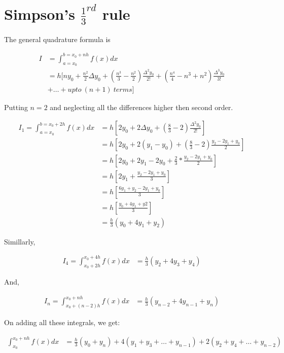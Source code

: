\documentclass{article}
\begin{document}
  \section{Simpson's $\frac{1}{3}^{rd}$ rule}
    The general quadrature formula is 

    \begin{align*}
      I &=\int_{a=x_0}^{b=x_0+nh}f(x)dx\\
        &= h[ny_0+\frac{n^2}{2}\Delta y_0+(\frac{n^3}{3}-\frac{n^2}{2})\frac{\Delta^2y_0}{2!}+(\frac{n^4}{4}-n^3+n^2)\frac{\Delta^3y_0}{3!}\\
        &+ \dots+upto\ (n+1)\ terms]
    \end{align*}

    Putting $n=2$ and neglecting all the differences higher then second order.

    \begin{align*}
      I_1=\int_{a=x_0}^{b=x_0+2h}f(x)dx &= h[2y_0+2\Delta y_0+(\frac{8}{3}-2)\frac{\Delta^2y_0}{2!}]\\
                                        &= h[2y_0+2(y_1-y_0)+(\frac{8}{3}-2)\frac{y_2-2y_1+y_0}{2}]\\
                                        &= h[2y_0+2y_1-2y_0+\frac{2}{3}*\frac{y_2-2y_1+y_0}{2}]\\
                                        &= h[2y_1+\frac{y_2-2y_1+y_0}{3}]\\
                                        &= h[\frac{6y_1+y_2-2y_1+y_0}{3}]\\
                                        &= h[\frac{y_0+4y_1+y2}{3}]\\
                                        &= \frac{h}{3}(y_0+4y_1+y_2)
    \end{align*}
    
    Simillarly,
    
    \begin{align*}
      I_4=\int_{x_0+2h}^{x_0+4h}f(x)dx &= \frac{h}{3}(y_2+4y_3+y_4)
    \end{align*}

    And,

    \begin{align*}
      I_n=\int_{x_0+(n-2)h}^{x_0+nh}f(x)dx &= \frac{h}{3}(y_{n-2}+4y_{n-1}+y_n)
    \end{align*}
    
    On adding all these integrals, we get:
    
    \begin{align*}
      \int_{x_0}^{x_0+nh}f(x)dx &= \frac{h}{3}(y_0+y_n)+4(y_1+y_3+\dots+y_{n-1})+2(y_2+y_4+\dots+y_{n-2})
    \end{align*}
\end{document}
